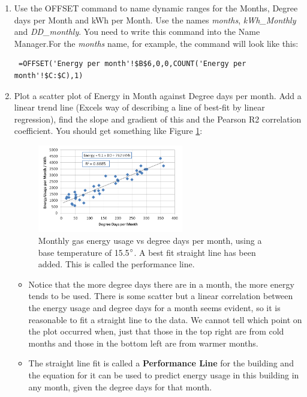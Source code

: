 \documentclass{article}
\begin{document}
\begin{enumerate}
\item Use the {\color{blue}OFFSET} command to name dynamic ranges for the Months, Degree days per Month and kWh per Month. Use the names \emph{months}, \emph{kWh\_Monthly} and \emph{DD\_monthly}. You need to write this command into the Name Manager.For the \emph{months} name, for example, the command will look like this:

{\color{blue}
\begin{verbatim}
 =OFFSET('Energy per month'!$B$6,0,0,COUNT('Energy per month'!$C:$C),1)
 \end{verbatim}
}
\item Plot a scatter plot of Energy in Month against Degree days per month. Add a linear trend line (Excels way of describing a line of best-fit by linear regression), find the slope and gradient of this and the Pearson R2 correlation coefficient. You should get something like Figure \ref{fig:perf_line_at_BT_15.5}:

\begin{figure}
\includegraphics[width=0.6\textwidth]{Monthly_Energy_vs_DD_15_5_BT}
\caption{Monthly gas energy usage vs degree days per month, using a base temperature of 15.5$\degree$. A best fit straight line has been added. This is called the performance line.}
\label{fig:perf_line_at_BT_15.5}
\end{figure}
{\color{OliveGreen}
\begin{itemize}
\item Notice that the more degree days there are in a month, the more energy tends to be used. There is some scatter but a linear correlation between the energy usage and degree days for a month seems evident, so it is reasonable to fit a straight line to the data. We cannot tell which point on the plot occurred when, just that those in the top right are from cold months and those in the bottom left are from warmer months. 

\item The straight line fit is called a \textbf{Performance Line} for the building and the equation for it can be used to predict energy usage in this building in any month, given the degree days for that month. 


\end{itemize}}
\end{enumerate}
\end{document}
